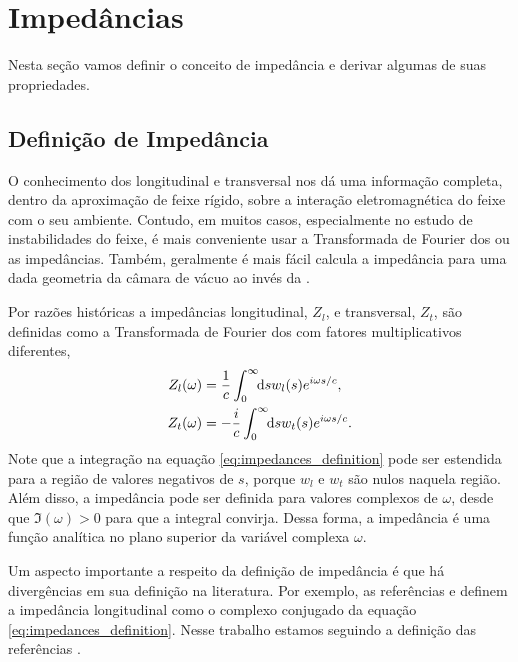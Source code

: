 \documentclass[
	12pt,				%
	openright,			%
	oneside,			%
	a4paper,		%
	chapter=TITLE,		%
	section=TITLE,		%
    brazil,				%
	english,			%
	sumario=tradicional,
	]{abntex2}
\begin{document}
\section{Impedâncias}

Nesta seção vamos definir o conceito de impedância e derivar algumas de suas propriedades.

\subsection{Definição de Impedância}
O conhecimento dos  longitudinal e transversal nos dá uma informação completa, dentro da aproximação de feixe rígido, sobre a interação eletromagnética do feixe com o seu ambiente. Contudo, em muitos casos, especialmente no estudo de instabilidades do feixe, é mais conveniente usar a Transformada de Fourier dos  ou as impedâncias. Também, geralmente é mais fácil calcula a impedância para uma dada geometria da câmara de vácuo ao invés da .

Por razões históricas a impedâncias longitudinal, $Z_l$, e transversal, $Z_t$, são definidas como a Transformada de Fourier dos  com fatores multiplicativos diferentes,
\begin{equation}\label{eq:impedances_definition}\begin{aligned}
Z_l(\omega) &= \frac1c \defint{s}{w_l(s)e^{i\omega s/c}}{0}{\infty},\\
Z_t(\omega) &= -\frac{i}{c} \defint{s}{w_t(s)e^{i\omega s/c}}{0}{\infty}.
\end{aligned}\end{equation}
Note que a integração na equação \eqref{eq:impedances_definition} pode ser estendida para a região de valores negativos de $s$, porque $w_l$ e $w_t$ são nulos naquela região. Além disso, a impedância pode ser definida para valores complexos de $\omega$, desde que $\Im(\omega) > 0 $ para que a integral convirja. Dessa forma, a impedância é uma função analítica no plano superior da variável complexa $\omega$.

Um aspecto importante a respeito da definição de impedância é que há divergências em sua definição na literatura. Por exemplo, as referências \cite{Zotter1993} e \cite{Wilson1987} definem a impedância longitudinal como o complexo conjugado da equação \eqref{eq:impedances_definition}. Nesse trabalho estamos seguindo a definição das referências \cite{CHao1993,Stupakov2000a,Heifets1991}.
\end{document}
